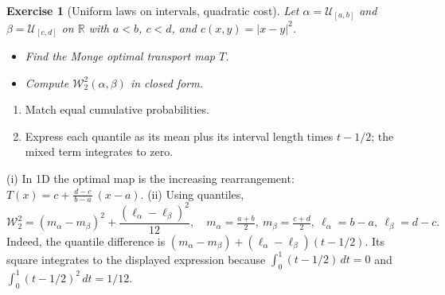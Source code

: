 \documentclass[11pt,a4paper]{article}
\theoremstyle{exostyle}
\newtheorem{exercise}{Exercise}
\newcommand{\R}{\mathbb{R}}
\newcommand{\Wtwo}{\mathcal{W}_2}
\newcommand{\Unif}{\mathcal U}
\begin{document}
\begin{exercise}[Uniform laws on intervals, quadratic cost]\label{exo:intervals}
Let $\alpha=\Unif_{[a,b]}$ and $\beta=\Unif_{[c,d]}$ on $\R$ with $a<b$, $c<d$, and $c(x,y)=|x-y|^2$.
\begin{itemize}[itemsep=2pt]
\item[(i)] Find the Monge optimal transport map $T$.
\item[(ii)] Compute $\Wtwo^2(\alpha,\beta)$ in closed form.
\end{itemize}
\end{exercise}
\begin{hints}
\begin{enumerate}[label=(\roman*)]\item Match equal cumulative probabilities.\item Express each quantile as its mean plus its interval length times $t-1/2$; the mixed term integrates to zero.\end{enumerate}
\end{hints}
\begin{solution}
(i) In 1D the optimal map is the increasing rearrangement:
$
T(x)=c+\frac{d-c}{\,b-a\,}\,(x-a).
$
(ii) Using quantiles,
\[
\Wtwo^2=(m_\alpha-m_\beta)^2+\frac{(\ell_\alpha-\ell_\beta)^2}{12},
\quad m_\alpha=\tfrac{a+b}{2},\ m_\beta=\tfrac{c+d}{2},\
\ell_\alpha=b-a,\ \ell_\beta=d-c.
\]
Indeed, the quantile difference is
$(m_\alpha-m_\beta)+(\ell_\alpha-\ell_\beta)(t-1/2)$.
Its square integrates to the displayed expression because
$\int_0^1(t-1/2)\,dt=0$ and $\int_0^1(t-1/2)^2\,dt=1/12$.
\end{solution}
\end{document}
